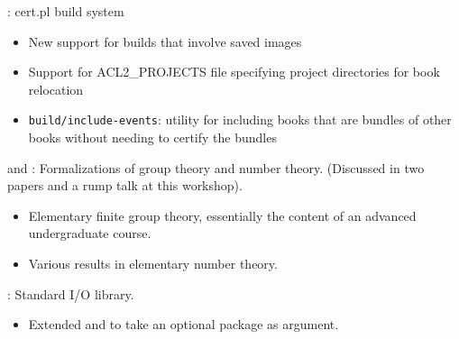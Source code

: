 
\begin{frame}

\implibtitle

:
cert.pl build system
\begin{itemize}
\item New support for builds that involve saved images
\item Support for ACL2\_PROJECTS file specifying project directories for book relocation
\item \texttt{build/include-events}: utility for including books that
  are bundles of other books without needing to certify the bundles
\end{itemize}

\end{frame}



\begin{frame}

\implibtitle

 and :
Formalizations of group theory and number theory.
(Discussed in two papers and a rump talk at this workshop).
\begin{itemize}
\item Elementary finite group theory,
      essentially the content of an advanced undergraduate course.
\item Various results in elementary number theory.
\end{itemize}

\end{frame}


\begin{frame}

\implibtitle

:
Standard I/O library.
\begin{itemize}
\item Extended  and 
      to take an optional package as argument.
\end{itemize}

\end{frame}



